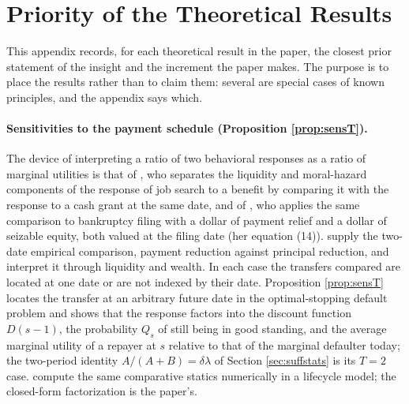 
\section{Priority of the Theoretical Results}\label{appendix:priority}

This appendix records, for each theoretical result in the paper, the closest prior statement of the insight and the increment the paper makes. The purpose is to place the results rather than to claim them: several are special cases of known principles, and the appendix says which.

\paragraph{Sensitivities to the payment schedule (Proposition \ref{prop:sensT}).} The device of interpreting a ratio of two behavioral responses as a ratio of marginal utilities is that of \citet{chetty_moral_2008}, who separates the liquidity and moral-hazard components of the response of job search to a benefit by comparing it with the response to a cash grant at the same date, and of \citet{indarte_moral_2023}, who applies the same comparison to bankruptcy filing with a dollar of payment relief and a dollar of seizable equity, both valued at the filing date (her equation (14)). \citet{ganong_liquidity_2020} supply the two-date empirical comparison, payment reduction against principal reduction, and interpret it through liquidity and wealth. In each case the transfers compared are located at one date or are not indexed by their date. Proposition \ref{prop:sensT} locates the transfer at an arbitrary future date in the optimal-stopping default problem and shows that the response factors into the discount function $D(s-1)$, the probability $Q_s$ of still being in good standing, and the average marginal utility of a repayer at $s$ relative to that of the marginal defaulter today; the two-period identity $A/(A+B) = \delta\lambda$ of Section \ref{sec:suffstats} is its $T=2$ case. \citet{campbell_model_2015} compute the same comparative statics numerically in a lifecycle model; the closed-form factorization is the paper's.

